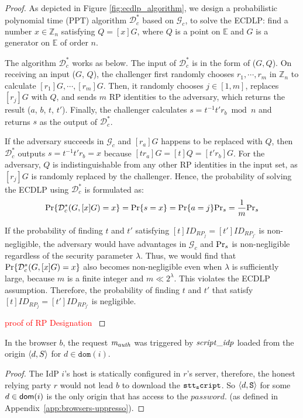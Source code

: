 \begin{theorem}
\begin{proof}
As depicted in Figure \ref{fig:ecdlp_algorithm}, we design a probabilistic polynomial time (PPT) algorithm $\mathcal{D}^*_c$ based on $\mathcal{G}_c$, to solve the ECDLP: find a number $x \in \mathbb{Z}_n$ satisfying $Q = [x]G$, where $Q$ is a point on $\mathbb{E}$ and $G$ is a generator on $\mathbb{E}$ of order $n$.




The algorithm $\mathcal{D}^*_c$ works as below.
The input of $\mathcal{D}^*_c$ is in the form of ($G, Q$). On receiving an input ($G$, $Q$), the challenger first randomly chooses $r_1, \cdots, r_m$ in $\mathbb{Z}_n$ to calculate $[r_1]G, \cdots, [r_m]G$.
Then, it randomly chooses $j \in [1,m]$, replaces $[r_j]G$ with $Q$, and sends $m$ RP identities to the adversary, which returns the result ($a$, $b$, $t$, $t'$). Finally, the challenger calculates $s = t^{-1}t'r_b \bmod n$ and returns $s$ as the output of $\mathcal{D}^*_c$.

If the adversary succeeds in $\mathcal{G}_c$ and $[r_a]G$ happens to be replaced with $Q$, then $\mathcal{D}^*_c$ outputs $s=t^{-1}t'r_b =x$ because $[tr_a]G = [t]Q = [t'r_b]G$. For the adversary, $Q$ is indistinguishable from any other RP identities in the input set, as $[r_j]G$ is randomly replaced by the challenger.
Hence, the probability of solving the ECDLP using $\mathcal{D}^*_c$ is formulated as:
\begin{equation*}
{\rm Pr}\{\mathcal{D}^*_c(G, [x]G)=x\} = {\rm Pr}\{s = x\}={\rm Pr}\{a=j\}{\rm Pr}_s=\frac{1}{m}{\rm Pr}_s
\end{equation*}

If the probability of finding $t$ and $t'$ satisfying $[t]ID_{RP_j} = [t']ID_{RP_{j'}}$ is non-negligible, the adversary would have advantages  in $\mathcal{G}_c$ and ${\rm Pr}_s$ is non-negligible regardless of the security parameter $\lambda$.
Thus, we would find that ${\rm Pr}\{\mathcal{D}^*_c(G, [x]G)=x\}$ also becomes non-negligible even when $\lambda$ is sufficiently large, because $m$ is a finite integer and $m \ll 2^\lambda$.
\oldc
This violates the ECDLP assumption. Therefore, the probability of finding $t$ and $t'$ that satisfy $[t]ID_{RP_j} = [t']ID_{RP_{j'}}$ is negligible. 
	
	
	\textcolor{red}{proof of RP Designation }
  \end{proof}
  
  \begin{lemma}\label{lemma:script-idp-trigger-request} %
    In the browser $b$, the request $\mathit{m_{auth}}$ was triggered by $\mathit{script\_idp}$ loaded from the origin $\langle {{}d, S} \rangle$ for $d \in \mathtt{dom}(i)$.
  \end{lemma}
  \begin{proof}
	The IdP $i$'s host is statically configured in $r$'s server, therefore, the honest relying party $r$ would not lead $b$ to download the $\mathtt{stt_script}$.  So $\langle d,\mathtt{S}\rangle$ for some $d \in \mathsf{dom}(i)$ is the only origin that has access to the $password$. (as defined in Appendix~\ref{app:browsers-uppresso}).
	

\end{proof}
\end{theorem}
